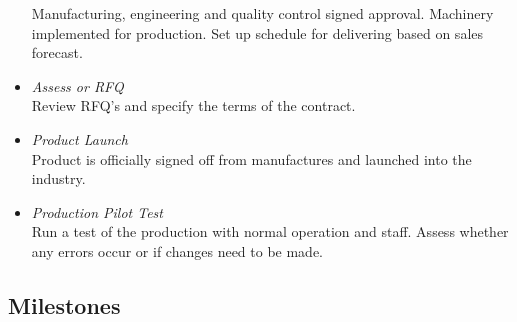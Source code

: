 \begin{itemize}
Manufacturing, engineering and quality control signed approval. Machinery implemented for production. Set up schedule for delivering based on sales forecast.
\item \emph{Assess or RFQ}\\
Review RFQ’s and specify the terms of the contract.
\item \emph{Product Launch}\\
Product is officially signed off from manufactures and launched into the industry.
\item \emph{Production Pilot Test}\\
Run a test of the production with normal operation and staff. Assess whether any errors occur or if changes need to be made.
\end{itemize}

\subsection{Milestones}

